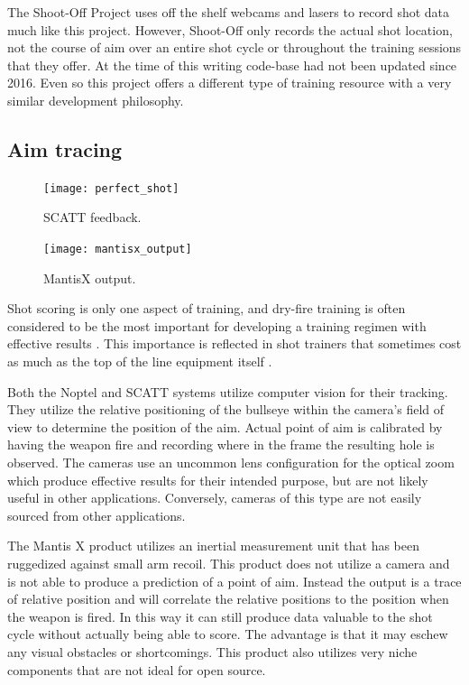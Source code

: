 \documentclass[conference]{IEEEtran}
\begin{document}
The Shoot-Off Project \cite{shootoff} uses off the shelf webcams and lasers to record shot data much like this project.
However, Shoot-Off only records the actual shot location, not the course of aim over an entire shot cycle or throughout the training sessions that they offer.
At the time of this writing code-base had not been updated since 2016.
Even so this project offers a different type of training resource with a very similar development philosophy.

\subsection{Aim tracing}

\begin{figure}[]
	\centering
	\texttt{[image: perfect\_shot]}
	\caption{SCATT \cite{scatt} feedback.}
	\label{fig:SCATT_Example}
\end{figure}

\begin{figure}[]
	\centering
	\texttt{[image: mantisx\_output]}
	\caption{MantisX \cite{mantisx} output.}
	\label{fig:MantisX_Example}
\end{figure}

Shot scoring is only one aspect of training, and dry-fire training is often 
considered to be the most important for developing a training regimen with effective results
\cite{Potter2017}.
This importance is reflected in shot trainers that sometimes cost as much as the top of the line equipment itself
\cite{scatt, noptel}.

Both the Noptel and SCATT systems utilize computer vision for their tracking.
They utilize the relative positioning of the bullseye within the camera's field of view to determine the position of the aim.
Actual point of aim is calibrated by having the weapon fire and recording where in the frame the resulting hole is observed.
The cameras use an uncommon lens configuration for the optical zoom which produce effective results for their intended purpose, but are not likely useful in other applications.
Conversely, cameras of this type are not easily sourced from other applications.

The Mantis X \cite{mantisx} product utilizes an inertial measurement unit that has been ruggedized against small arm recoil. 
This product does not utilize a camera and is not able to produce a prediction of a point of aim.
Instead the output is a trace of relative position and will correlate the relative positions to the position when the weapon is fired.
In this way it can still produce data valuable to the shot cycle without actually being able to score.
The advantage is that it may eschew any visual obstacles or shortcomings.
This product also utilizes very niche components that are not ideal for open source.
\end{document}
